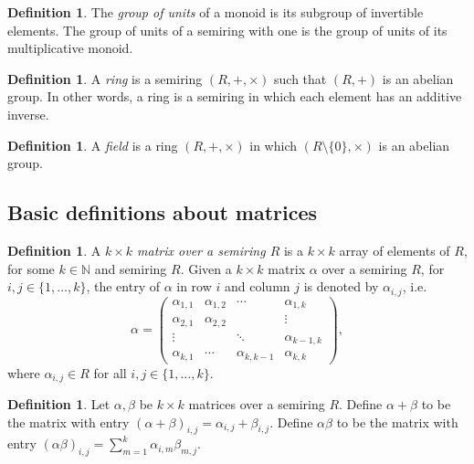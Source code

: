 \documentclass{article}
\newcommand{\N}{\mathbb{N}}
\theoremstyle{definition}
\newtheorem{defn}[thm]{Definition}
\begin{document}
\begin{defn}
  The \emph{group of units} of a monoid is its subgroup of invertible elements.
  The group of units of a semiring with one is the group of units of its
  multiplicative monoid.
\end{defn}

\begin{defn}
  A \emph{ring} is a semiring $(R, +, \times)$ such that $(R, +)$ is an abelian
  group. In other words, a ring is a semiring in which each element has an
  additive inverse.
\end{defn}

\begin{defn}
  A \emph{field} is a ring $(R, +, \times)$ in which $(R \setminus \{0\},
  \times)$ is an abelian group.
\end{defn}


\subsection{Basic definitions about matrices}

\begin{defn}
  A \emph{$k \times k$ matrix over a semiring $R$} is a $k \times k$ array of
  elements of $R$, for some $k \in \N$ and semiring $R$. Given a $k
  \times k$ matrix $\alpha$ over a semiring $R$, for $i, j \in \{1, \ldots,
  k\}$, the entry of $\alpha$ in row $i$ and column $j$ is denoted by
  $\alpha_{i, j}$, i.e.
  $$\alpha
  =
  \begin{pmatrix}
    \alpha_{1, 1} & \alpha_{1, 2} & \cdots            & \alpha_{1, k} \\
    \alpha_{2, 1} & \alpha_{2, 2} &                   & \vdots \\
    \vdots        &               & \ddots            & \alpha_{k - 1, k} \\
    \alpha_{k, 1} & \cdots        & \alpha_{k, k - 1} & \alpha_{k, k}
  \end{pmatrix},$$
  where $\alpha_{i, j} \in R$ for all $i, j \in \{1, \ldots, k\}$.
\end{defn}

\begin{defn}
  Let $\alpha, \beta$ be $k \times k$ matrices over a semiring $R$.  Define
  $\alpha + \beta$ to be the matrix with entry ${(\alpha + \beta)}_{i, j} =
  \alpha_{i, j} + \beta_{i, j}$.  Define $\alpha\beta$ to be the matrix
  with entry ${(\alpha\beta)}_{i, j} = \sum_{m = 1}^{k}
  \alpha_{i, m} \beta_{m, j}$.
\end{defn}
\end{document}
